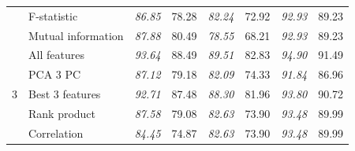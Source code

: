 \documentclass{llncs}
\begin{document}
\begin{table}
\begin{tabular}{|r|l|p{1.2cm}|p{1.2cm}|p{1.2cm}|p{1.2cm}|p{1.2cm}|p{1.2cm}|}
                                                     & F-statistic                                           & \textit{86.85}                      & 78.28                              & \textit{82.24}                      & 72.92                              & \textit{92.93}                      & 89.23                              \\
                                                     & Mutual information                                    & \textit{87.88}                      & 80.49                              & \textit{78.55}                      & 68.21                              & \textit{92.93}                      & 89.23                              \\ \hline
\multirow{7}{*}{3}                                   & All features                                          & \textit{93.64}                      & 88.49                              & \textit{89.51}                      & 82.83                              & \textit{94.90}                      & 91.49                              \\
                                                     & PCA 3 PC                                              & \textit{87.12}                      & 79.18                              & \textit{82.09}                      & 74.33                              & \textit{91.84}                      & 86.96                              \\
                                                     & Best 3 features                                       & \textit{92.71}                      & 87.48                              & \textit{88.30}                      & 81.96                              & \textit{93.80}                      & 90.72                              \\
                                                     & Rank product                                          & \textit{87.58}                      & 79.08                              & \textit{82.63}                      & 73.90                              & \textit{93.48}                      & 89.99                              \\
                                                     & Correlation                                           & \textit{84.45}                      & 74.87                              & \textit{82.63}                      & 73.90                              & \textit{93.48}                      & 89.99                              \\

\end{tabular}
\end{table}
\end{document}
